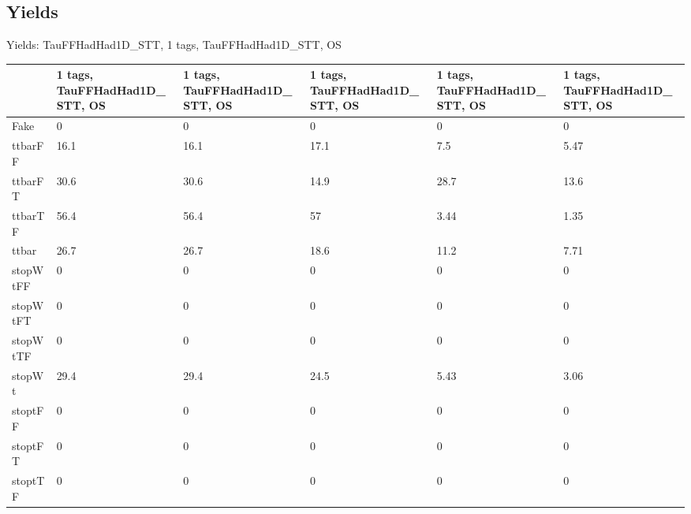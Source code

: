 
\subsection{Yields}

\begin{frame}{Yields: TauFFHadHad1D\_STT, 1 tags, TauFFHadHad1D\_STT, OS}
\begin{center}
  \begin{tabular}{l| >{\centering\let\newline\\\arraybackslash\hspace{0pt}}m{1.4cm}| >{\centering\let\newline\\\arraybackslash\hspace{0pt}}m{1.4cm}| >{\centering\let\newline\\\arraybackslash\hspace{0pt}}m{1.4cm}| >{\centering\let\newline\\\arraybackslash\hspace{0pt}}m{1.4cm}| >{\centering\let\newline\\\arraybackslash\hspace{0pt}}m{1.4cm}}
    & 1 tags, TauFFHadHad1D\_STT, OS & 1 tags, TauFFHadHad1D\_STT, OS & 1 tags, TauFFHadHad1D\_STT, OS & 1 tags, TauFFHadHad1D\_STT, OS & 1 tags, TauFFHadHad1D\_STT, OS \\
 \hline \hline
    Fake& 0 & 0 & 0 & 0 & 0 \\
 \hline
    ttbarFF& 16.1 & 16.1 & 17.1 & 7.5 & 5.47 \\
 \hline
    ttbarFT& 30.6 & 30.6 & 14.9 & 28.7 & 13.6 \\
 \hline
    ttbarTF& 56.4 & 56.4 & 57 & 3.44 & 1.35 \\
 \hline
    ttbar& 26.7 & 26.7 & 18.6 & 11.2 & 7.71 \\
 \hline
    stopWtFF& 0 & 0 & 0 & 0 & 0 \\
 \hline
    stopWtFT& 0 & 0 & 0 & 0 & 0 \\
 \hline
    stopWtTF& 0 & 0 & 0 & 0 & 0 \\
 \hline
    stopWt& 29.4 & 29.4 & 24.5 & 5.43 & 3.06 \\
 \hline
    stoptFF& 0 & 0 & 0 & 0 & 0 \\
 \hline
    stoptFT& 0 & 0 & 0 & 0 & 0 \\
 \hline
    stoptTF& 0 & 0 & 0 & 0 & 0 \\

\end{tabular}
\end{center}
\end{frame}
